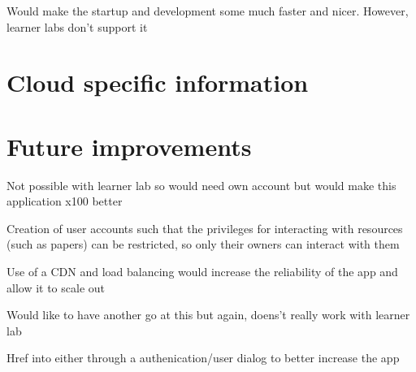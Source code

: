 \documentclass[12pt]{article}
\begin{document}
Would make the startup and development some much faster and nicer. However, learner labs don't support it




\section*{Cloud specific information}




\section*{Future improvements}

Not possible with learner lab so would need own account but would make this application x100 better

Creation of user accounts such that the privileges for interacting with resources (such as papers) can be restricted, so only their owners can interact with them

Use of a CDN and load balancing would increase the reliability of the app and allow it to scale out 

Would like to have another go at this but again, doens't really work with learner lab

Href into either through a authenication/user dialog to better increase the app 

\end{document}
